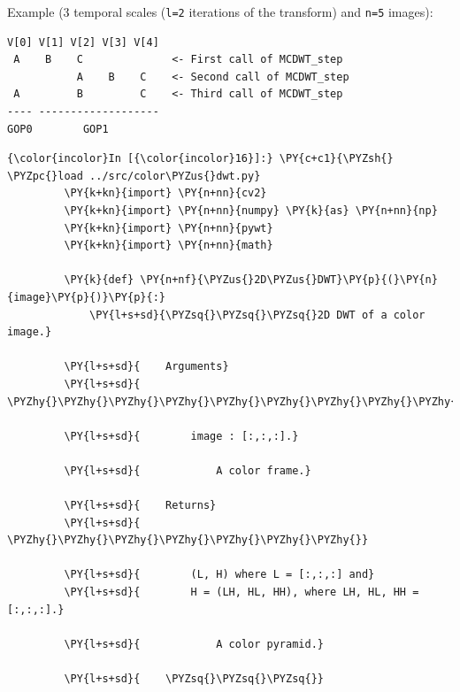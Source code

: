 {Example (3 temporal scales (\texttt{l=2} iterations of the transform)
and \texttt{n=5} images):

\begin{verbatim}
V[0] V[1] V[2] V[3] V[4]
 A    B    C              <- First call of MCDWT_step
           A    B    C    <- Second call of MCDWT_step
 A         B         C    <- Third call of MCDWT_step
---- -------------------
GOP0        GOP1
\end{verbatim}

    \begin{Verbatim}[commandchars=\\\{\}]
{\color{incolor}In [{\color{incolor}16}]:} \PY{c+c1}{\PYZsh{} \PYZpc{}load ../src/color\PYZus{}dwt.py}
         \PY{k+kn}{import} \PY{n+nn}{cv2}
         \PY{k+kn}{import} \PY{n+nn}{numpy} \PY{k}{as} \PY{n+nn}{np}
         \PY{k+kn}{import} \PY{n+nn}{pywt}
         \PY{k+kn}{import} \PY{n+nn}{math}
         
         \PY{k}{def} \PY{n+nf}{\PYZus{}2D\PYZus{}DWT}\PY{p}{(}\PY{n}{image}\PY{p}{)}\PY{p}{:}
             \PY{l+s+sd}{\PYZsq{}\PYZsq{}\PYZsq{}2D DWT of a color image.}
         
         \PY{l+s+sd}{    Arguments}
         \PY{l+s+sd}{    \PYZhy{}\PYZhy{}\PYZhy{}\PYZhy{}\PYZhy{}\PYZhy{}\PYZhy{}\PYZhy{}\PYZhy{}}
         
         \PY{l+s+sd}{        image : [:,:,:].}
         
         \PY{l+s+sd}{            A color frame.}
         
         \PY{l+s+sd}{    Returns}
         \PY{l+s+sd}{    \PYZhy{}\PYZhy{}\PYZhy{}\PYZhy{}\PYZhy{}\PYZhy{}\PYZhy{}}
         
         \PY{l+s+sd}{        (L, H) where L = [:,:,:] and}
         \PY{l+s+sd}{        H = (LH, HL, HH), where LH, HL, HH = [:,:,:].}
         
         \PY{l+s+sd}{            A color pyramid.}
         
         \PY{l+s+sd}{    \PYZsq{}\PYZsq{}\PYZsq{}}
         

\end{Verbatim}}
